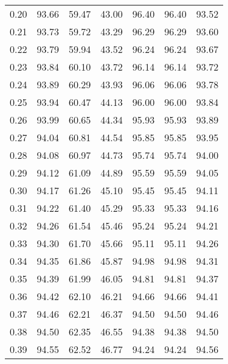 \begin{tabular}{|c|c|c|c|c|c|c|}
      0.20 &     93.66 &     59.47 &      43.00 &   96.40 &      96.40 &         93.52 \\
      0.21 &     93.73 &     59.72 &      43.29 &   96.29 &      96.29 &         93.60 \\
      0.22 &     93.79 &     59.94 &      43.52 &   96.24 &      96.24 &         93.67 \\
      0.23 &     93.84 &     60.10 &      43.72 &   96.14 &      96.14 &         93.72 \\
      0.24 &     93.89 &     60.29 &      43.93 &   96.06 &      96.06 &         93.78 \\
      0.25 &     93.94 &     60.47 &      44.13 &   96.00 &      96.00 &         93.84 \\
      0.26 &     93.99 &     60.65 &      44.34 &   95.93 &      95.93 &         93.89 \\
      0.27 &     94.04 &     60.81 &      44.54 &   95.85 &      95.85 &         93.95 \\
      0.28 &     94.08 &     60.97 &      44.73 &   95.74 &      95.74 &         94.00 \\
      0.29 &     94.12 &     61.09 &      44.89 &   95.59 &      95.59 &         94.05 \\
      0.30 &     94.17 &     61.26 &      45.10 &   95.45 &      95.45 &         94.11 \\
      0.31 &     94.22 &     61.40 &      45.29 &   95.33 &      95.33 &         94.16 \\
      0.32 &     94.26 &     61.54 &      45.46 &   95.24 &      95.24 &         94.21 \\
      0.33 &     94.30 &     61.70 &      45.66 &   95.11 &      95.11 &         94.26 \\
      0.34 &     94.35 &     61.86 &      45.87 &   94.98 &      94.98 &         94.31 \\
      0.35 &     94.39 &     61.99 &      46.05 &   94.81 &      94.81 &         94.37 \\
      0.36 &     94.42 &     62.10 &      46.21 &   94.66 &      94.66 &         94.41 \\
      0.37 &     94.46 &     62.21 &      46.37 &   94.50 &      94.50 &         94.46 \\
      0.38 &     94.50 &     62.35 &      46.55 &   94.38 &      94.38 &         94.50 \\
      0.39 &     94.55 &     62.52 &      46.77 &   94.24 &      94.24 &         94.56 \\

\end{tabular}

